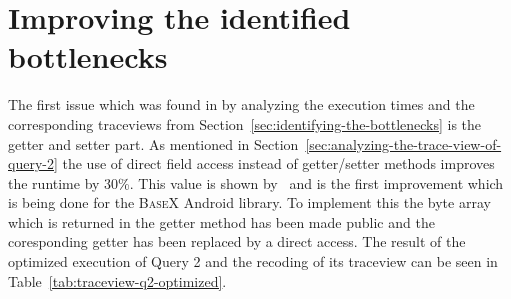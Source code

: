 \section{Improving the identified bottlenecks}
\label{sec:improving}
The first issue which was found in by analyzing the execution times and the corresponding traceviews from Section~\ref{sec:identifying-the-bottlenecks} is the getter and setter part.
As mentioned in Section~\ref{sec:analyzing-the-trace-view-of-query-2} the use of direct field access instead of getter/setter methods improves the runtime by 30\%.
This value is shown by~\cite{toninianalysis} and is the first improvement which is being done for the \textsc{BaseX} Android library.
To implement this the byte array which is returned in the getter method has been made public and the coresponding getter has been replaced by a direct access.
The result of the optimized execution of Query 2 and the recoding of its traceview can be seen in Table~\ref{tab:traceview-q2-optimized}.


